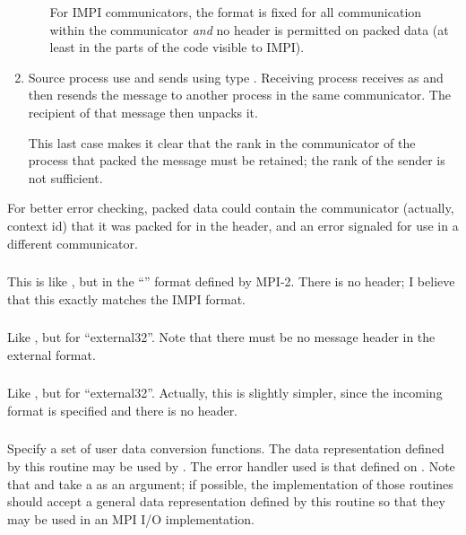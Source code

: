 \documentclass{article}
\begin{document}
\begin{enumerate}
\begin{enumerate}
    For IMPI communicators, the format is fixed for all communication within
    the communicator \emph{and} no header is permitted on packed data (at
    least in the parts of the code visible to IMPI).
  \end{enumerate}
\item Source process use  and sends using type
  .  Receiving process receives as 
  and then resends the message to another process in the same communicator.
  The recipient of that message then unpacks it.

  This last case makes it clear that the rank in the communicator of the
  process that packed the message must be retained; the rank of the sender is
  not sufficient.
\end{enumerate}

For better error checking, packed data could contain the communicator
(actually, context id) that it was packed for in the header, and an
error signaled for use in a different communicator.

\subsubsection{}
This is like , but in the ``'' format
defined by MPI-2.  There is no header; I believe that this exactly matches the
IMPI format.

\subsubsection{}
Like , but for ``external32''.  Note that there
must be no message header in the external format.

\subsubsection{}
Like , but for ``external32''.  Actually, this is
slightly simpler, since the incoming format is specified and there is
no header.

\subsubsection{}
Specify a set of user data conversion functions.  The data representation
defined by this routine may be used by .  The error
handler used is that defined on .  Note that
 and  take a
 as an argument; if possible, the implementation of those
routines should accept a general data representation defined by this routine
so that they may be used in an MPI I/O implementation.
\end{document}
